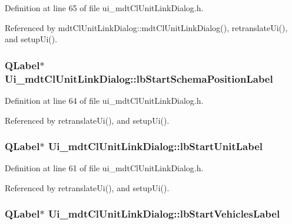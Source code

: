 Definition at line 65 of file ui\-\_\-mdt\-Cl\-Unit\-Link\-Dialog.\-h.



Referenced by mdt\-Cl\-Unit\-Link\-Dialog\-::mdt\-Cl\-Unit\-Link\-Dialog(), retranslate\-Ui(), and setup\-Ui().

\hypertarget{class_ui__mdt_cl_unit_link_dialog_aa6dd9f92aea5eb3cea8e3b24b6e11e4f}{
\subsubsection[{lb\-Start\-Schema\-Position\-Label}]{\setlength{\rightskip}{0pt plus 5cm}Q\-Label$\ast$ Ui\-\_\-mdt\-Cl\-Unit\-Link\-Dialog\-::lb\-Start\-Schema\-Position\-Label}}\label{class_ui__mdt_cl_unit_link_dialog_aa6dd9f92aea5eb3cea8e3b24b6e11e4f}


Definition at line 64 of file ui\-\_\-mdt\-Cl\-Unit\-Link\-Dialog.\-h.



Referenced by retranslate\-Ui(), and setup\-Ui().

\hypertarget{class_ui__mdt_cl_unit_link_dialog_a721948d531221588edac25a79038b475}{
\subsubsection[{lb\-Start\-Unit\-Label}]{\setlength{\rightskip}{0pt plus 5cm}Q\-Label$\ast$ Ui\-\_\-mdt\-Cl\-Unit\-Link\-Dialog\-::lb\-Start\-Unit\-Label}}\label{class_ui__mdt_cl_unit_link_dialog_a721948d531221588edac25a79038b475}


Definition at line 61 of file ui\-\_\-mdt\-Cl\-Unit\-Link\-Dialog.\-h.



Referenced by retranslate\-Ui(), and setup\-Ui().

\hypertarget{class_ui__mdt_cl_unit_link_dialog_a0a3f9dba0fb11d412595cbae06f1aaa4}{
\subsubsection[{lb\-Start\-Vehicles\-Label}]{\setlength{\rightskip}{0pt plus 5cm}Q\-Label$\ast$ Ui\-\_\-mdt\-Cl\-Unit\-Link\-Dialog\-::lb\-Start\-Vehicles\-Label}}\label{class_ui__mdt_cl_unit_link_dialog_a0a3f9dba0fb11d412595cbae06f1aaa4}


